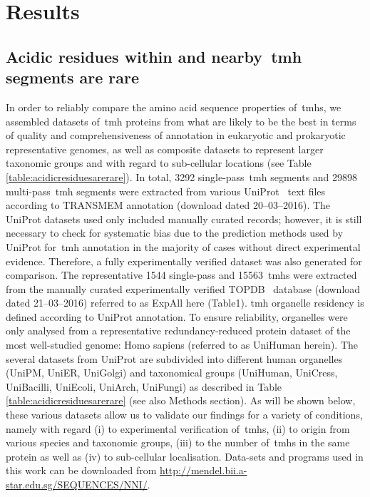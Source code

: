 \section{Results}

\subsection{Acidic residues within and nearby~\gls{tmh} segments are rare}

In order to reliably compare the amino acid sequence properties of~\gls{tmh}s, we assembled datasets of~\gls{tmh} proteins from what are likely to be the best in terms of quality and comprehensiveness of annotation in eukaryotic and prokaryotic representative genomes, as well as composite datasets to represent larger taxonomic groups and with regard to sub-cellular locations (see Table \ref{table:acidicresiduesarerare}).
In total, 3292 single-pass~\gls{tmh} segments and 29898 multi-pass~\gls{tmh} segments were extracted from various UniProt~\cite{TheUniProtConsortium2014} text files according to TRANSMEM annotation (download dated 20--03--2016).
The UniProt datasets used only included manually curated records; however, it is still necessary to check for systematic bias due to the prediction methods used by UniProt for~\gls{tmh} annotation in the majority of cases without direct experimental evidence.
Therefore, a fully experimentally verified dataset was also generated for comparison.
The representative 1544 single-pass and 15563~\gls{tmh}s were extracted from the manually curated experimentally verified TOPDB~\cite{Dobson2015} database (download dated 21--03--2016) referred to as ExpAll here (Table1).
\gls{tmh} organelle residency is defined according to UniProt annotation.
To ensure reliability, organelles were only analysed from a representative redundancy-reduced protein dataset of the most well-studied genome: Homo sapiens (referred to as UniHuman herein).
The several datasets from UniProt  are subdivided into different human organelles (UniPM, UniER, UniGolgi) and taxonomical groups (UniHuman, UniCress, UniBacilli, UniEcoli, UniArch, UniFungi) as described in Table \ref{table:acidicresiduesarerare} (see also Methods section).
As will be shown below, these various datasets allow us to validate our findings for a variety of conditions, namely with regard (i) to experimental verification of~\gls{tmh}s, (ii) to origin from various species and taxonomic groups, (iii) to the number of~\gls{tmh}s in the same protein as well as (iv) to sub-cellular localisation.
Data-sets and programs used in this work can be downloaded from \url{http://mendel.bii.a-star.edu.sg/SEQUENCES/NNI/}.


